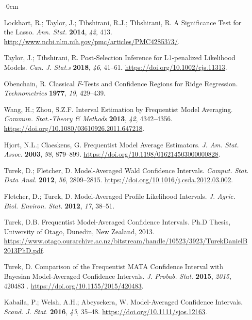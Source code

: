\documentclass[entropy,article,accept,pdftex,moreauthors]{Definitions/mdpi}
\begin{document}
\begin{adjustwidth}{-\extralength}{0cm}
\begin{thebibliography}{999}
Lockhart, R.; Taylor, J.;  Tibshirani, R.J.; Tibshirani, R. A Significance Test for the Lasso.  \emph{Ann.
 Stat.} \textbf{2014}, \emph{42}, 413.
\url{http://www.ncbi.nlm.nih.gov/pmc/articles/PMC4285373/}.

Taylor, J.;  Tibshirani, R.  Post-Selection
Inference for {L1-penalized} Likelihood Models.  \emph{Can.
J. Stat.s} \textbf{2018}, \emph{46},  41--61.
\url{https://doi.org/10.1002/cjs.11313}.

Obenchain, R.  Classical \(F\)-Tests and Confidence Regions for
Ridge Regression.  \emph{Technometrics} \textbf{1977}, \emph{19}, 429--439.

Wang, H.;   Zhou, S.Z.F. Interval Estimation by
Frequentist Model Averaging.  \emph{Commun. Stat.-Theory \& Methods } \textbf{2013}, \emph{42},  4342--4356.
\url{https://doi.org/10.1080/03610926.2011.647218}.

Hjort, N.L.; Claeskens, G.  Frequentist {Model
Average Estimators}.  \emph{J. Am. Stat.
Assoc.} \textbf{2003}, \emph{98}, 879--899.
\url{https://doi.org/10.1198/016214503000000828}.

Turek,  D.; Fletcher, D. Model-Averaged {Wald}
Confidence Intervals.  \emph{Comput. Stat. Data
Anal.} \textbf{2012}, \emph{56},  2809--2815.
\url{https://doi.org/10.1016/j.csda.2012.03.002}.

Fletcher, D.; Turek, D. Model-Averaged Profile
Likelihood Intervals.  \emph{J. Agric. Biol.  
Environ. Stat.} \textbf{2012}, \emph{17},  38--51.

Turek, D.B. Frequentist Model-Averaged Confidence
Intervals.  Ph.D Thesis, University of Otago, Dunedin, New Zealand, 2013. %
\url{https://www.otago.ourarchive.ac.nz/bitstream/handle/10523/3923/TurekDanielB2013PhD.pdf}.

Turek, D.  Comparison of the Frequentist {MATA} Confidence
Interval with {Bayesian} Model-Averaged Confidence Intervals. 
\emph{J. Probab. Stat.} \textbf{2015}, \emph{2015}, 420483 .
\url{https://doi.org/10.1155/2015/420483}.

Kabaila, P.; Welsh, A.H.;  Abeysekera, W.
Model-{Averaged} {Confidence} {Intervals}.  \emph{Scand.
J. Stat.} \textbf{2016}, \emph{43},  35--48.
\url{https://doi.org/10.1111/sjos.12163}.


\end{thebibliography}
\end{adjustwidth}
\end{document}
